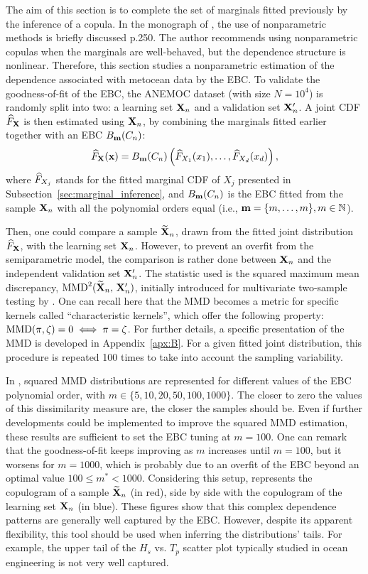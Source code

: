 The aim of this section is to complete the set of marginals fitted previously by the inference of a copula. 
In the monograph of \citet{joe2011dependence}, the use of nonparametric methods is briefly discussed p.250. 
The author recommends using nonparametric copulas when the marginals are well-behaved, but the dependence structure is nonlinear. 
Therefore, this section studies a nonparametric estimation of the dependence associated with metocean data by the EBC. 
To validate the goodness-of-fit of the EBC, the ANEMOC dataset (with size $N=10^4$) is randomly split into two: a learning set ${\bf X}_n$ and a validation set ${\bf X}_n'$. 
A joint CDF $\widehat{F}_{\bf X}$ is then estimated using ${\bf X}_n$, by combining the marginals fitted earlier together with an EBC $B_{{\bf m}}(C_n)$: 
\begin{equation}
    \widehat{F}_{\bf X}({\bf x}) = B_{{\bf m}}(C_n)\left(\widehat{F}_{X_1}(x_1), \dots, \widehat{F}_{X_d}(x_d)\right),
\end{equation}
where $\widehat{F}_{X_j}$ stands for the fitted marginal CDF of $X_j$ presented in Subsection~\ref{sec:marginal_inference}, 
and $B_{{\bf m}}(C_n)$ is the EBC fitted from the sample ${\bf X}_n$ with all the polynomial orders equal (i.e., ${\bf m} = \{m, \dots, m\}, m\in\mathbb{N}$).

Then, one could compare a sample $\widetilde{{\bf X}}_n$, drawn from the fitted joint distribution $\widehat{F}_{\bf X}$, with the learning set ${\bf X}_n$. 
However, to prevent an overfit from the semiparametric model, the comparison is rather done between ${\bf X}_n$ and the independent validation set ${\bf X}_n'$. 
The statistic used is the squared maximum mean discrepancy, $\mathrm{MMD}^2(\widetilde{{\bf X}}_n, \, {\bf X}_n')$, initially introduced for multivariate two-sample testing by \cite{gretton_2006}. 
One can recall here that the MMD becomes a metric for specific kernels called “characteristic kernels”, which offer the following property: $\mathrm{MMD}(\pi, \zeta)=0 \iff \pi = \zeta$. 
For further details, a specific presentation of the MMD is developed in Appendix~\ref{apx:B}. 
For a given fitted joint distribution, this procedure is repeated 100 times to take into account the sampling variability. 

In , squared MMD distributions are represented for different values of the EBC polynomial order, with $m\in\{5, 10, 20, 50, 100, 1000\}$. 
The closer to zero the values of this dissimilarity measure are, the closer the samples should be. 
Even if further developments could be implemented to improve the squared MMD estimation, these results are sufficient to set the EBC tuning at $m=100$. 
One can remark that the goodness-of-fit keeps improving as $m$ increases until $m=100$, but it worsens for $m=1000$, which is probably due to an overfit of the EBC beyond an optimal value $100 \leq m^* < 1000$. 
Considering this setup,  represents the copulogram of a sample $\widetilde{{\bf X}}_n$ (in red), side by side with the copulogram of the learning set ${\bf X}_n$ (in blue). 
These figures show that this complex dependence patterns are generally well captured by the EBC. 
However, despite its apparent flexibility, this tool should be used when inferring the distributions' tails. 
For example, the upper tail of the $H_s$ vs. $T_p$ scatter plot typically studied in ocean engineering is not very well captured.


